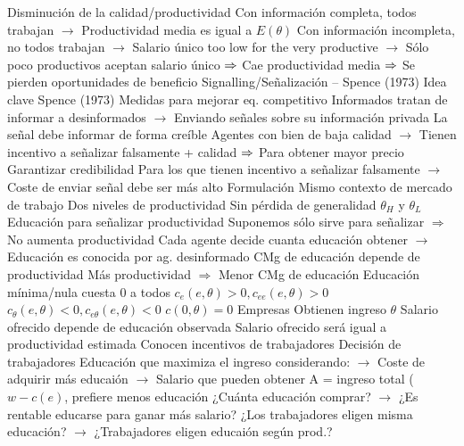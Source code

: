 \documentclass{nuevotema}
\begin{document}
\begin{esquemal}
				\4 Disminución de la calidad/productividad
				\4[] Con información completa, todos trabajan
				\4[] $\to$ Productividad media es igual a $E(\theta)$
				\4[] Con información incompleta, no todos trabajan
				\4[] $\to$ Salario único too low for the very productive
				\4[] $\to$ Sólo poco productivos aceptan salario único
				\4[] $\Rightarrow$ Cae productividad media
				\4[] $\Rightarrow$ Se pierden oportunidades de beneficio
		\2 Signalling/Señalización -- Spence (1973)
			\3 Idea clave
				\4 Spence (1973)
				\4 Medidas para mejorar eq. competitivo
				\4[] Informados tratan de informar a desinformados
				\4[] $\to$ Enviando señales sobre su información privada
				\4 La señal debe informar de forma creíble
				\4[] Agentes con bien de baja calidad
				\4[] $\to$ Tienen incentivo a señalizar falsamente + calidad
				\4[] $\Rightarrow$ Para obtener mayor precio
				\4 Garantizar credibilidad
				\4[] Para los que tienen incentivo a señalizar falsamente
				\4[] $\to$ Coste de enviar señal debe ser más alto
			\3 Formulación
				\4 Mismo contexto de mercado de trabajo
				\4 Dos niveles de productividad
				\4[] Sin pérdida de generalidad
				\4[] $\theta_H$ y $\theta_L$
				\4 Educación para señalizar productividad
				\4[] Suponemos sólo sirve para señalizar
				\4[] $\Rightarrow$ No aumenta productividad
				\4[] Cada agente decide cuanta educación obtener
				\4[] $\to$ Educación es conocida por ag. desinformado
				\4 CMg de educación depende de productividad
				\4[] Más productividad $\Rightarrow$ Menor CMg de educación
				\4[] Educación mínima/nula cuesta 0 a todos
				\4[] $c_e(e, \theta) > 0, c_{ee}(e,\theta) > 0$
				\4[] $c_\theta (e,\theta) < 0, c_{e\theta}(e,\theta) < 0$
				\4[] $c(0, \theta) = 0$
				\4 Empresas
				\4[] Obtienen ingreso $\theta$
				\4[] Salario ofrecido depende de educación observada
				\4[] Salario ofrecido será igual a productividad estimada
				\4[] Conocen incentivos de trabajadores
				\4 Decisión de trabajadores
				\4[] Educación que maximiza el ingreso considerando:
				\4[] $\to$ Coste de adquirir más educaión
				\4[] $\to$ Salario que pueden obtener
				\4[] A = ingreso total ($w-c(e)$, prefiere menos educación
				\4[] ¿Cuánta educación comprar?
				\4[] $\to$ ¿Es rentable educarse para ganar más salario?
				\4[] ¿Los trabajadores eligen misma educación?
				\4[] $\to$ ¿Trabajadores eligen educaión según prod.?

\end{esquemal}
\end{document}
